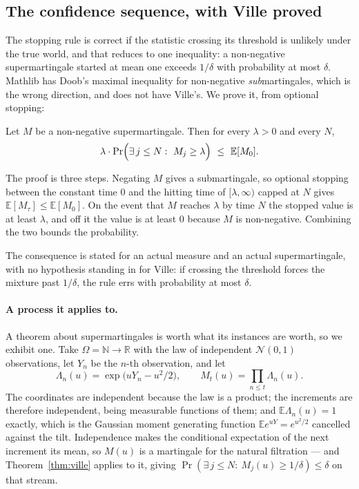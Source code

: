 \subsection{The confidence sequence, with Ville proved}
\label{sec:ville}

The stopping rule is correct if the statistic crossing its threshold is unlikely under the
true world, and that reduces to one inequality: a non-negative supermartingale started at
mean one exceeds $1/\delta$ with probability at most $\delta$. Mathlib has Doob's maximal
inequality for non-negative \emph{sub}martingales, which is the wrong direction, and does
not have Ville's. We prove it, from optional stopping:

\begin{theorem}
\label{thm:ville}
Let $M$ be a non-negative supermartingale. Then for every $\lambda>0$ and every $N$,
\[
\lambda\cdot\Pr\Bigl(\exists\, j\le N:\ M_{j}\ge\lambda\Bigr)\ \le\ \mathbb{E}[M_{0}].
\]
\end{theorem}

The proof is three steps. Negating $M$ gives a submartingale, so optional stopping between
the constant time $0$ and the hitting time of $[\lambda,\infty)$ capped at $N$ gives
$\mathbb{E}[M_{\tau}]\le\mathbb{E}[M_{0}]$. On the event that $M$ reaches $\lambda$ by time
$N$ the stopped value is at least $\lambda$, and off it the value is at least $0$ because
$M$ is non-negative. Combining the two bounds the probability.

The consequence is stated for an actual measure and an actual supermartingale, with no
hypothesis standing in for Ville: if crossing the threshold forces the mixture past
$1/\delta$, the rule errs with probability at most $\delta$.


\paragraph{A process it applies to.}
A theorem about supermartingales is worth what its instances are worth, so we exhibit one.
Take $\Omega=\mathbb{N}\to\mathbb{R}$ with the law of independent $\mathcal{N}(0,1)$
observations, let $Y_{n}$ be the $n$-th observation, and let
\[
\Lambda_{n}(u)=\exp\!\bigl(uY_{n}-u^{2}/2\bigr),
\qquad
M_{t}(u)=\prod_{n\le t}\Lambda_{n}(u).
\]
The coordinates are independent because the law is a product; the increments are therefore
independent, being measurable functions of them; and $\mathbb{E}\Lambda_{n}(u)=1$ exactly,
which is the Gaussian moment generating function $\mathbb{E}e^{uY}=e^{u^{2}/2}$ cancelled
against the tilt. Independence makes the conditional expectation of the next increment its
mean, so $M(u)$ is a martingale for the natural filtration --- and Theorem~\ref{thm:ville}
applies to it, giving
$\Pr(\exists\, j\le N:\ M_{j}(u)\ge1/\delta)\le\delta$ on that stream.

